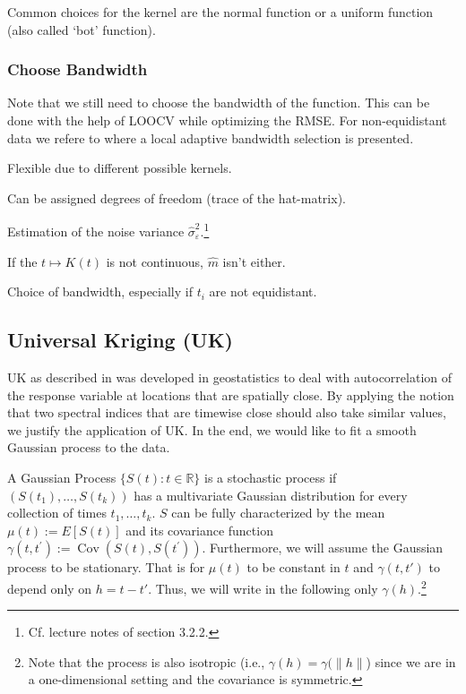 		Common choices for the kernel are the normal function or a uniform function (also called `bot' function). 
		\subsubsection*{Choose Bandwidth}
		Note that we still need to choose the bandwidth of the function. This can be done with the help of LOOCV while optimizing the RMSE. For non-equidistant data we refere to \cite{brockmannLocallyAdaptiveBandwidth1993} where a local adaptive bandwidth selection is presented.

		\begin{my_pros_cons_table}{
				\item Flexible due to different possible kernels.
				\item Can be assigned degrees of freedom (trace of the hat-matrix).
				\item Estimation of the noise variance $\hat \sigma_\varepsilon^2$.\footnote{Cf. lecture notes of \cite{buhlmanComputationalStatistics2020} section 3.2.2.}
			}{
				\item If the $t \mapsto K(t)$ is not continuous, $\hat m $ isn't either.
				\item Choice of bandwidth, especially if $t_i$ are not equidistant.
			}
		\end{my_pros_cons_table}


	\subsection{Universal Kriging (UK)}
		\label{sec:Kriging}

		UK as described in \cite{diggleGaussianModelsGeostatistical2007} was developed in geostatistics to deal with autocorrelation of the response variable at locations that are spatially close. By applying the notion that two spectral indices that are timewise close should also take similar values, we justify the application of UK. In the end, we would like to fit a smooth Gaussian process to the data.

		A Gaussian Process $\{S(t) : t\in \mathbb R\} $ is a stochastic process if $(S(t_1),\dots,S(t_k))$ has a multivariate Gaussian distribution for every collection of times ${t_1, \dots , t_k}$. $S$ can be fully characterized by the mean $\mu(t):=E[S(t)]$ and its covariance function $\gamma\left(t, t^{\prime}\right):=\operatorname{Cov}\left(S(t), S\left(t^{\prime}\right)\right)$. 
		Furthermore, we will assume the Gaussian process to be stationary. That is for $\mu(t)$ to be constant in $t$ and $\gamma(t,t')$ to depend only on $h=t-t'$. Thus, we will write in the following only $\gamma(h)$.\footnote{Note that the process is also {isotropic} (i.e., $\gamma(h)=\gamma(\|h\|$) since we are in a one-dimensional setting and the covariance is symmetric.}

